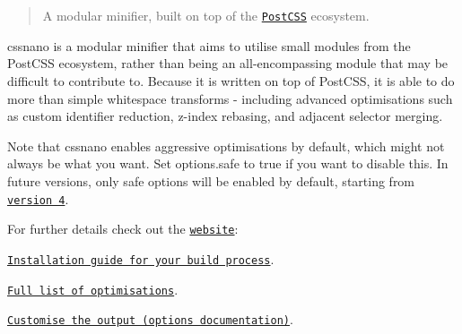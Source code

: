 \section*{~\newline
  ~\newline
 ~\newline
 ~\newline
 }

\begin{quote}
A modular minifier, built on top of the \href{https://github.com/postcss/postcss}{\tt Post\+C\+SS} ecosystem. \end{quote}


\href{https://travis-ci.org/ben-eb/cssnano}{\tt } \href{https://ci.appveyor.com/project/ben-eb/cssnano/branch/master}{\tt } \href{https://coveralls.io/github/ben-eb/cssnano?branch=master}{\tt } \href{http://badge.fury.io/js/cssnano}{\tt } \href{https://gemnasium.com/ben-eb/cssnano}{\tt } \href{https://gitter.im/ben-eb/cssnano?utm_source=badge&utm_medium=badge&utm_campaign=pr-badge&utm_content=badge}{\tt }

cssnano is a modular minifier that aims to utilise small modules from the Post\+C\+SS ecosystem, rather than being an all-\/encompassing module that may be difficult to contribute to. Because it is written on top of Post\+C\+SS, it is able to do more than simple whitespace transforms -\/ including advanced optimisations such as custom identifier reduction, {\ttfamily z-\/index} rebasing, and adjacent selector merging.

Note that cssnano enables aggressive optimisations by default, which might not always be what you want. Set {\ttfamily options.\+safe} to {\ttfamily true} if you want to disable this. In future versions, only safe options will be enabled by default, starting from \href{https://github.com/ben-eb/cssnano/issues/88}{\tt version 4}.

For further details check out the \href{http://cssnano.co/}{\tt website}\+:


\begin{DoxyItemize}
\item \href{http://cssnano.co/usage/}{\tt Installation guide for your build process}.
\item \href{http://cssnano.co/optimisations/}{\tt Full list of optimisations}.
\item \href{http://cssnano.co/options/}{\tt Customise the output (options documentation)}.
\end{DoxyItemize}

